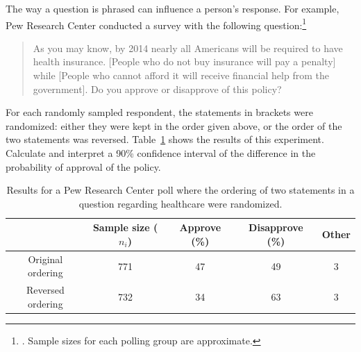 \begin{example}{The way a question is phrased can influence a person's response. For example, Pew Research Center conducted a survey with the following question:\footnote{. Sample sizes for each polling group are approximate.}
\begin{quote}
As you may know, by 2014 nearly all Americans will be required to have health insurance. [People who do not buy insurance will pay a penalty] while [People who cannot afford it will receive financial help from the government]. Do you approve or disapprove of this policy?
\end{quote}
For each randomly sampled respondent, the statements in brackets were randomized: either they were kept in the order given above, or the order of the two statements was reversed. Table~\ref{pewPollResultsForRandomizedStatementOrdering} shows the results of this experiment. Calculate and interpret a 90\% confidence interval of the difference in the probability of approval of the policy.

\begin{table}[h]
\centering
\begin{tabular}{c c c c c}
	& Sample size ($n_i$) & Approve (\%)	& Disapprove (\%)	& Other \\
\hline
Original ordering & 771	& 47	& 49	& 3 \\
Reversed ordering & 732	& 34	& 63	& 3 \\
\hline
\end{tabular}
\caption{Results for a Pew Research Center poll where the ordering of two statements in a question regarding healthcare were randomized.}
\label{pewPollResultsForRandomizedStatementOrdering}
\end{table}

}
\end{example}
